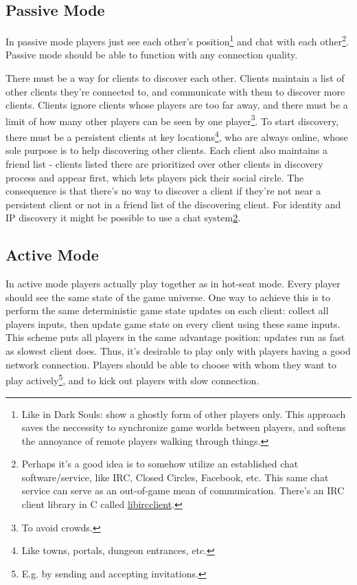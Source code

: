 \documentclass[12pt]{article}
\begin{document}
\subsection{Passive Mode}

In passive mode players just see each other's position\footnote{
    Like in Dark Souls: show a ghostly form of other players only.
    This approach saves the neccessity to synchronize game worlds
    between players, and softens the annoyance of remote players
    walking through things.
} and chat with each other\footnote{
    \label{Chat}
    Perhaps it's a good idea is to somehow utilize an established chat
    software/service, like IRC, Closed Circles, Facebook, etc.
    This same chat service can serve as an out-of-game mean of
    communication.
    There's an IRC client library in C called
    \href{http://www.ulduzsoft.com/libircclient/index.html}%
    {libircclient}.
}.
Passive mode should be able to function with any connection quality.

There must be a way for clients to discover each other.
Clients maintain a list of other clients they're connected to,
and communicate with them to discover more clients.
Clients ignore clients whose players are too far away, and there must
be a limit of how many other players can be seen by one player\footnote{
    To avoid crowds.
}.
To start discovery, there must be a persistent clients at key
locations\footnote{
    Like towns, portals, dungeon entrances, etc.
}, who are always online, whose sole purpose is to help discovering other
clients.
Each client also maintains a friend list - clients listed there are
prioritized over other clients in discovery process and appear first,
which lets players pick their social circle.
The consequence is that there's no way to discover a client if
they're not near a persistent client or not in a friend list of the
discovering client.
For identity and IP discovery it might be possible to use a chat
system\cref{Chat}.

\subsection{Active Mode}

In active mode players actually play together as in hot-seat mode.
Every player should see the same state of the game universe.
One way to achieve this is to perform the same deterministic game
state updates on each client: collect all players inputs, then
update game state on every client using these same inputs.
This scheme puts all players in the same advantage position:
updates run as fast as slowest client does.
Thus, it's desirable to play only with players having a good network connection.
Players should be able to choose with whom they want to play
actively\footnote{
    E.g. by sending and accepting invitations.
}, and to kick out players with slow connection.
\end{document}
